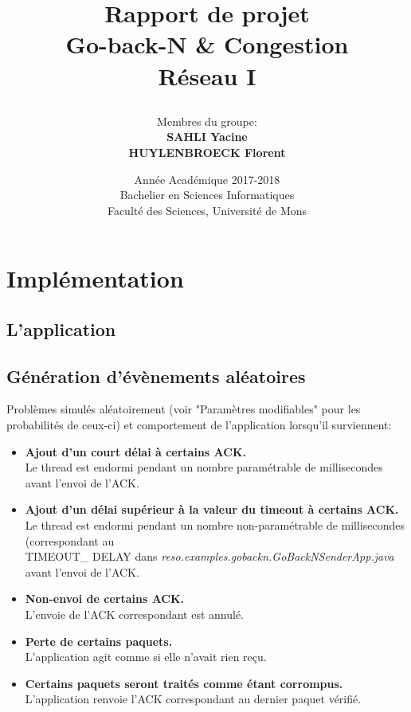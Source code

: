 \documentclass[]{article}
\begin{document}
\title{
{Rapport de projet}\\
\smallskip
{\Huge Go-back-N \& Congestion}\\
Réseau I\\
\author{Membres du groupe:\\
\textbf{SAHLI Yacine}\\
\textbf{HUYLENBROECK Florent}\\
}}

\date{Année Académique 2017-2018\\
Bachelier en Sciences Informatiques\\
\vspace{1cm}
Faculté des Sciences, Université de Mons}

\maketitle
\newpage
\section{Implémentation}
\subsection{L'application}
\subsection{Génération d'évènements aléatoires}
Problèmes simulés aléatoirement (voir "Paramètres modifiables" pour les probabilités de ceux-ci) et comportement de l'application lorsqu'il surviennent:
\begin{itemize}
\item \textbf{Ajout d'un court délai à certains ACK.}\\
Le thread est endormi pendant un nombre paramétrable de millisecondes avant l'envoi de l'ACK.
\item \textbf{Ajout d'un délai supérieur à la valeur du timeout à certains ACK.}\\
Le thread est endormi pendant un nombre non-paramétrable de millisecondes (correspondant au\\ TIMEOUT\_ DELAY dans \emph{reso.examples.gobackn.GoBackNSenderApp.java} avant l'envoi de l'ACK.
\item \textbf{Non-envoi de certains ACK.}\\
L'envoie de l'ACK correspondant est annulé.
\item \textbf{Perte de certains paquets.}\\
L'application agit comme si elle n'avait rien reçu.
\item \textbf{Certains paquets seront traités comme étant corrompus.}\\
L'application renvoie l'ACK correspondant au dernier paquet vérifié.
\end{itemize}
\end{document}
